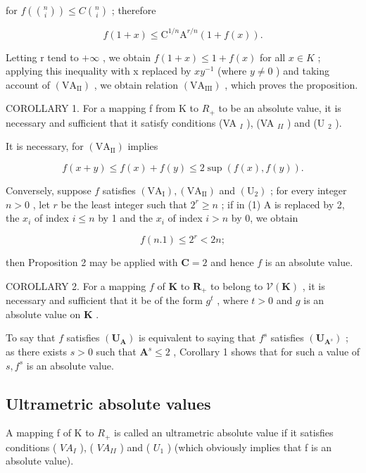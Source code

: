 for \(f\left(\binom{n}{i}\right) \leqslant C\binom{n}{i}\) ; therefore

\[
f (1 + x) \leqslant \mathrm{C} ^ {1 / n} \mathrm{A} ^ {r / n} (1 + f (x)).
\]

Letting r tend to \(+\infty\) , we obtain \(f(1+x)\leqslant1+f(x)\) for all \(x\in K\) ; applying this inequality with x replaced by \(xy^{-1}\) (where \(y\neq0\) ) and taking account of \((\mathrm{VA}_{\mathrm{II}})\) , we obtain relation \((\mathrm{VA}_{\mathrm{III}})\) , which proves the proposition.

COROLLARY 1. For a mapping f from K to \(R_{+}\) to be an absolute value, it is necessary and sufficient that it satisfy conditions (VA \(_{I}\) ), (VA \(_{II}\) ) and (U \(_{2}\) ).

It is necessary, for \((\mathrm{VA}_{\mathrm{II}})\) implies

\[
f (x + y) \leqslant f (x) + f (y) \leqslant 2 \sup (f (x), f (y)).
\]

Conversely, suppose \(f\) satisfies \((\mathrm{VA}_{\mathrm{I}}), (\mathrm{VA}_{\mathrm{II}})\) and \((\mathrm{U}_2)\) ; for every integer \(n > 0\) , let \(r\) be the least integer such that \(2^r \geqslant n\) ; if in (1) A is replaced by 2, the \(x_i\) of index \(i \leqslant n\) by 1 and the \(x_i\) of index \(i > n\) by 0, we obtain

\[
f (n. 1) \leqslant 2 ^ {r} <   2 n;
\]

then Proposition 2 may be applied with \(\mathbf{C} = 2\) and hence \(f\) is an absolute value.

COROLLARY 2. For a mapping \(f\) of \(\mathbf{K}\) to \(\mathbf{R}_+\) to belong to \(\mathcal{V}(\mathbf{K})\) , it is necessary and sufficient that it be of the form \(g^t\) , where \(t > 0\) and \(g\) is an absolute value on \(\mathbf{K}\) .

To say that \(f\) satisfies \((\mathbf{U}_{\mathbf{A}})\) is equivalent to saying that \(f^s\) satisfies \((\mathbf{U}_{\mathbf{A}^s})\) ; as there exists \(s > 0\) such that \(\mathbf{A}^s \leqslant 2\) , Corollary 1 shows that for such a value of \(s, f^s\) is an absolute value.

\subsection{Ultrametric absolute values}

A mapping f of K to \(R_{+}\) is called an ultrametric absolute value if it satisfies conditions ( \(VA_{I}\) ), ( \(VA_{II}\) ) and ( \(U_{1}\) ) (which obviously implies that f is an absolute value).

